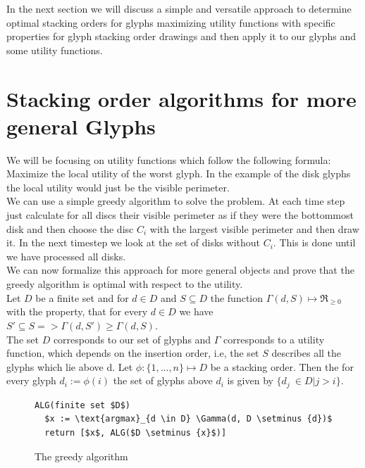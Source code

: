 \documentclass[a4paper,11pt]{article}
\begin{document}
In the next section we will discuss a simple and versatile approach to determine optimal stacking orders for glyphs maximizing utility functions with specific properties for glyph stacking order drawings and then apply it to our glyphs and some utility functions.

\section{Stacking order algorithms for more general Glyphs}

We will be focusing on utility functions which follow the following formula: Maximize the local utility of the worst glyph. In the example of the disk glyphs the local utility would just be the visible perimeter. \\We can use a simple greedy algorithm to solve the problem. At each time step just calculate for all discs their visible perimeter as if they were the bottommost disk and then choose the disc $C_i$ with the largest visible perimeter and then draw it. In the next timestep we look at the set of disks without $C_i$. This is done until we have processed all disks.\\

We can now formalize this approach for more general objects and prove that the greedy algorithm is optimal with respect to the utility.
\\

Let $D$ be a finite set and for $d \in D$ and $S \subseteq D$ the function $ \Gamma(d, S) \mapsto \Re_{\geq 0} $ with the property, that for every $d \in D$ we have $S' \subseteq S => \Gamma(d, S') \geq \Gamma(d, S)$. \\
The set $D$ corresponds to our set of glyphs and $\Gamma$ corresponds to a utility function, which depends on the insertion order, i.e, the set $S$ describes all the glyphs which lie above d. Let $\phi: \{1,...,n\} \mapsto D$ be a stacking order. Then the for every glyph $d_i:=\phi(i)$ the set of glyphs above $d_i$ is given by $\{d_j\ \in D | j > i\}$.

\begin{figure}[!t]
  \begin{lstlisting}[mathescape=true ]
ALG(finite set $D$)
  $x := \text{argmax}_{d \in D} \Gamma(d, D \setminus {d})$
  return [$x$, ALG($D \setminus {x}$)]
  \end{lstlisting}
  \caption{The greedy algorithm}
\end{figure}
\end{document}
